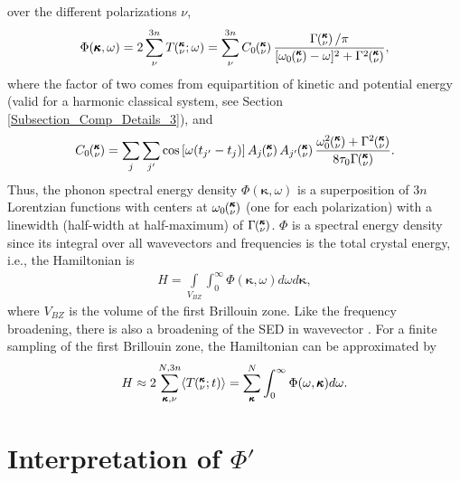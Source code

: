 over the different polarizations $\nu$,
\begin{equation}\label{A:E:Lorentzian_NMD}
\begin{split}
\Phi(\pmb{\kappa},\omega) = 2\sum_{\nu}^{3n} T\kvw=\sum_{\nu}^{3n}C_0\kv
\frac{\Gamma\kv/\pi}{[\omega_0\kv-\omega]^2+\Gamma^2\kv},
\end{split}
\end{equation}
where the factor of two comes from equipartition of kinetic and potential 
energy (valid for a harmonic classical system, see Section 
\ref{Subsection_Comp_Details_3}), and
\begin{equation}\label{A:E:C_0}
\begin{split}
C_0\kv = \sum_j\sum_{j'}\cos\left[\omega (t_{j'}-t_j)\right]A_j\kv A_{j'}
\kv\frac{\omega_0^2\kv+\Gamma^2\kv}{8\tau_0\Gamma\kv}.
\end{split}
\end{equation}
Thus, the phonon spectral energy density $\Phi(\pmb{\kappa},\omega)$ is 
a superposition of $3n$ Lorentzian
functions with centers at $\omega_0\mspace{-4.0mu}\left(\mspace{-8.0mu} \begin{smallmatrix}&\pmb{\kappa} \\&\nu\end{smallmatrix} \mspace{-3.0mu}\right)$ (one for each polarization) with 
a linewidth (half-width at half-maximum) of
$\Gamma\mspace{-4.0mu}\left(\mspace{-8.0mu} \begin{smallmatrix}&\pmb{\kappa} \\&\nu\end{smallmatrix} \mspace{-3.0mu}\right)$. $\Phi$ is a spectral energy density since its integral over 
all wavevectors and frequencies is the total crystal energy, i.e., 
the Hamiltonian is
\begin{equation}\label{A:E:equipartition}
\begin{split}
H=\int\limits_{V_{BZ}} \int_{0}^{\infty}\Phi(\pmb{\kappa},\omega)d\omega 
d\pmb{\kappa},
\end{split}
\end{equation}
where $V_{BZ}$ is the volume of the first Brillouin zone.  Like the 
frequency broadening, there is also a broadening of the SED in wavevector 
\cite{turney_predicting_2009-1}. For a finite sampling of the 
first Brillouin zone, 
the Hamiltonian can be approximated by
\begin{equation}\label{A:E:equipartition}
\begin{split}
H \approx 2\sum_{\pmb{\kappa},\nu}^{N,3n}\langle T\mspace{-4.0mu}\left(\mspace{-8.0mu} \begin{smallmatrix}&\pmb{\kappa} \\&\nu\end{smallmatrix} \mspace{-2.0mu};t\right)\rangle = 
\sum_{\pmb{\kappa}}^N \int_{0}^{\infty}\Phi(\omega,\pmb{\kappa})d\omega.
\end{split}
\end{equation}


\section{\label{Appendix_B}Interpretation of $\Phi'$}

